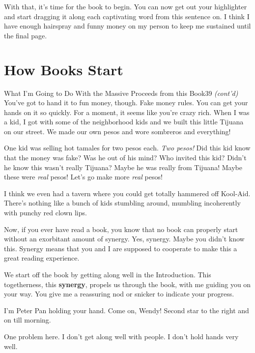 \documentclass[10pt,twoside]{report}
\begin{document}
With that, it's time for the book to begin.  You can now get out your
highlighter and start dragging it along each captivating word from
this sentence on.  I think I have enough hairspray and funny money on
my person to keep me sustained until the final page.
	
\section{How Books Start}

	\begin{sidebar}{What I'm Going to Do With the Massive Proceeds from this Book}{39}
	\textit{(cont'd)} You've got to hand it to fun money, though. Fake money rules. You can get your hands on it so quickly. For a moment, it seems like you're crazy rich. When I was a kid, I got with some of the neighborhood kids and we built this little Tijuana on our street. We made our own pesos and wore sombreros and everything!\vspace{6pt}
	
	One kid was selling hot tamales for two pesos each. \textit{Two pesos!} Did this kid know that the money was fake? Was he out of his mind? Who invited this kid? Didn't he know this wasn't really Tijuana? Maybe he was really from Tijuana! Maybe these were \textit{real} pesos! Let's go make more \textit{real} pesos!\vspace{6pt}
	
	I think we even had a tavern where you could get totally hammered off Kool-Aid. There's nothing like a bunch of kids stumbling around, mumbling incoherently with punchy red clown lips.
	\end{sidebar}

Now, if you ever have read a book, you know that no book can properly
start without an exorbitant amount of synergy.  Yes, synergy.  Maybe
you didn't know this.  Synergy means that you and I are supposed to
cooperate to make this a great reading experience.

We start off the book by getting along well in the Introduction.  This
togetherness, this {\bf synergy}, propels us through the book, with me
guiding you on your way.  You give me a reassuring nod or snicker to
indicate your progress.

I'm Peter Pan holding your hand.  Come on, Wendy!  Second star to the
right and on till morning.

One problem here.  I don't get along well with people.  I don't hold
hands very well.
\end{document}
